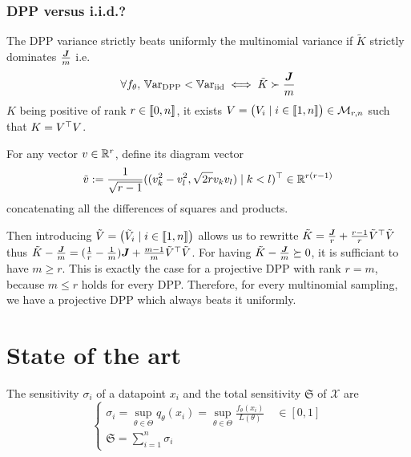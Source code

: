 \subsubsection{DPP versus i.i.d.?}
The DPP variance strictly beats uniformly the multinomial variance if $\tilde K$ strictly dominates $\frac{\boldsymbol{J}}{m}$ i.e. 
\begin{equation}
	\forall f_\theta, \, \operatorname{\mathbb V ar}_{\textrm{DPP}} < \operatorname{\mathbb V ar}_{\textrm{iid}} \iff \tilde K \succ \frac{\boldsymbol{J}}{m}
\end{equation}
$K$ being positive of rank $r \in \llbracket 0,n \rrbracket$, it exists $V = \begin{pmatrix}
	V_i \mid i\in \llbracket 1,n \rrbracket
\end{pmatrix} \in \mathcal{M}_{r,n}$ such that $K = V^\top V$.

For any vector $v \in \mathbb{R}^{r}$, \cite{copenhaver2013diagramvectors} define its diagram vector 
$$\tilde v :=
 \frac{1}{\sqrt{r-1}} ((v_k^{2}-v_l^{2} , \sqrt{2 r} v_k v_l ) \mid k<l)^\top \in \mathbb{R}^{r(r-1)}$$
concatenating all the differences of squares and products.

Then introducing $\tilde V = \begin{pmatrix}\tilde V_i \mid i\in\llbracket 1,n \rrbracket\end{pmatrix}
$ allows us to rewritte $\tilde K = \frac{\boldsymbol{J}}{r} + \frac{r-1}{r} \tilde V^\top \tilde V$ thus $\tilde K - \frac{\boldsymbol{J}}{m} = (\frac{1}{r}-\frac{1}{m})\boldsymbol{J} + \frac{m-1}{m} \tilde V^\top \tilde V$. For having $\tilde K - \frac{\boldsymbol{J}}{m}\succeq 0$, it is sufficiant to have $m \geq r$. This is exactly the case for a projective DPP with rank $r = m$, because $m \leq r$ holds for every DPP. Therefore, for every multinomial sampling, we have a projective DPP which always beats it uniformly.


\section{State of the art}
\begin{definition}[Sensitivity]
	The sensitivity $\sigma_i$ of a datapoint $x_{i}$ and the total sensitivity $\mathfrak S$ of $\mathcal X$ are
	$$
	\begin{cases}
		\sigma_{i}=\sup_{\theta \in \Theta} q_{\theta}(x_i) = \sup _{\theta \in \Theta} \frac{f_{\theta}\left(x_{i}\right)}{L(\theta)} \quad \in[0,1]\\
		\mathfrak{S}=\sum_{i=1}^{n} \sigma_{i}
	\end{cases}
	$$
\end{definition} 

